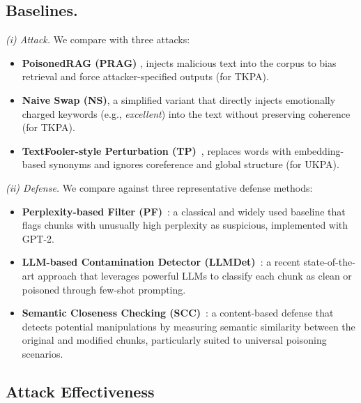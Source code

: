 \documentclass[letterpaper]{article} %
\begin{document}
\subsection{Baselines.}
\emph{(i) Attack.} We compare with three attacks:
\begin{itemize}
    \item \textbf{PoisonedRAG (PRAG)}  \cite{DBLP:journals/corr/abs-2402-07867}, injects malicious text into the corpus to bias retrieval and force attacker-specified outputs (for TKPA).
    \item \textbf{Naive Swap (NS)}, a simplified variant that directly injects emotionally charged keywords (e.g., \textit{excellent}) into the text without preserving coherence (for TKPA).
    \item \textbf{TextFooler-style Perturbation (TP)}~\cite{DBLP:conf/aaai/JinJZS20}, replaces words with embedding-based synonyms and ignores coreference and global structure (for UKPA).
\end{itemize}
\emph{(ii) Defense.} We compare against three representative defense methods:
\begin{itemize}
    \item \textbf{Perplexity-based Filter (PF)}~\cite{Radford2019}: a classical and widely used baseline that flags chunks with unusually high perplexity as suspicious, implemented with GPT-2.
    \item \textbf{LLM-based Contamination Detector (LLMDet)}~\cite{DBLP:journals/corr/abs-2309-00614}: a recent state-of-the-art approach that leverages powerful LLMs to classify each chunk as clean or poisoned through few-shot prompting.
    \item \textbf{Semantic Closeness Checking (SCC)}~\cite{Honnibal2020}: a content-based defense that detects potential manipulations by measuring semantic similarity between the original and modified chunks, particularly suited to universal poisoning scenarios.
\end{itemize}

\subsection{Attack Effectiveness}
\end{document}
